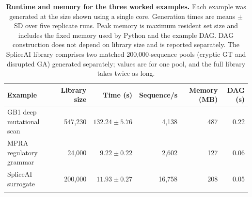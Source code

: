 \begin{table}[p]
\centering
\footnotesize
\caption{\textbf{Runtime and memory for the three worked examples.} Each example was generated at the size shown using a single core. Generation times are means $\pm$ SD over five replicate runs. Peak memory is maximum resident set size and includes the fixed memory used by Python and the example DAG. DAG construction does not depend on library size and is reported separately. The SpliceAI library comprises two matched 200,000-sequence pools (cryptic GT and disrupted GA) generated separately; values are for one pool, and the full library takes twice as long.}
\label{tab:benchmark-summary}
\begin{tabular}{@{}lrrrrr@{}}
\toprule
Example & Library size & Time (s) & Sequence/s & Memory (MB) & DAG (s)\\
\midrule
GB1 deep mutational scan & 547,230 & $132.24 \pm 5.76$ & 4,138 & 487 & 0.22\\
MPRA regulatory grammar & 24,000 & $9.22 \pm 0.22$ & 2,602 & 127 & 0.06\\
SpliceAI surrogate & 200,000 & $11.93 \pm 0.27$ & 16,758 & 208 & 0.05\\
\botrule
\end{tabular}
\end{table}
